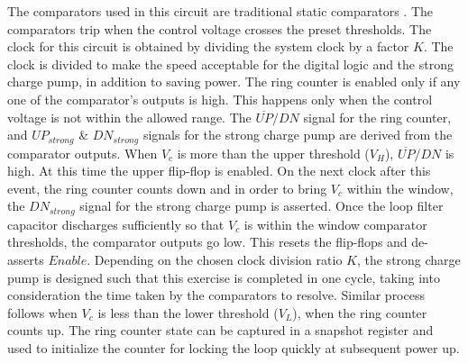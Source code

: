 \documentclass[journal,twoside,letterpaper]{IEEEtran}
\begin{document}
The comparators used in this circuit are traditional 
static comparators \cite{baker_cmos}.
The comparators trip when the control voltage crosses
the preset thresholds.
The clock for this circuit is obtained by dividing the system clock 
by a factor $K$.
The clock is divided to make the speed acceptable for the 
digital logic and the strong charge pump, in addition to saving power.
The ring counter is enabled only if any one of the comparator's outputs
is high. This happens only when the control voltage is not within the allowed
range. The $\overline{UP}/DN$ signal for the ring counter, and 
$UP_{strong}$ \& $DN_{strong}$ signals for the strong 
charge pump are derived from the 
comparator outputs. When $V_c$ is more than 
the upper threshold ($V_H$),
$\overline{UP}/DN$ is high. At this time the upper flip-flop is enabled.
On the next clock after this event, the ring counter counts down and in
order to bring $V_c$ within the window, the $DN_{strong}$ signal for the
strong charge pump is asserted. Once the loop filter capacitor discharges 
sufficiently so that $V_c$ is within the window comparator
thresholds, the comparator outputs go low. This resets the
flip-flops and de-asserts $Enable$. 
Depending on the chosen clock division ratio $K$,
the strong charge pump is designed
such that this exercise is completed in one cycle,
taking into consideration the time taken by the comparators to resolve.
Similar process follows
when $V_c$ is less than the lower threshold ($V_L$),
when the ring counter counts up.
The ring counter state can be
captured in a snapshot register and used to initialize
the counter for locking the loop quickly at subsequent power up.
\end{document}

